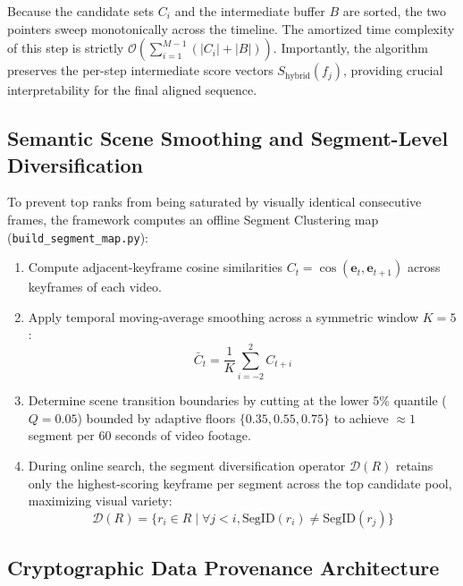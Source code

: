 Because the candidate sets $C_i$ and the intermediate buffer $B$ are sorted, the two pointers sweep monotonically across the timeline. The amortized time complexity of this step is strictly $\mathcal{O}(\sum_{i=1}^{M-1} (|C_i| + |B|))$. Importantly, the algorithm preserves the per-step intermediate score vectors $S_{\text{hybrid}}(f_j)$, providing crucial interpretability for the final aligned sequence.

\subsection{Semantic Scene Smoothing and Segment-Level Diversification}\label{sec:diversify}

To prevent top ranks from being saturated by visually identical consecutive frames, the framework computes an offline Segment Clustering map (\texttt{build\_segment\_map.py}):
\begin{enumerate}[label=\arabic*.]
    \item Compute adjacent-keyframe cosine similarities $C_t = \cos(\mathbf{e}_t, \mathbf{e}_{t+1})$ across keyframes of each video.
    \item Apply temporal moving-average smoothing across a symmetric window $K = 5$:
    \begin{equation}
    \bar{C}_t = \frac{1}{K} \sum_{i=-2}^{2} C_{t+i}
    \end{equation}
    \item Determine scene transition boundaries by cutting at the lower 5\% quantile ($Q = 0.05$) bounded by adaptive floors $\{0.35, 0.55, 0.75\}$ to achieve $\approx 1$ segment per 60 seconds of video footage.
    \item During online search, the segment diversification operator $\mathcal{D}(R)$ retains only the highest-scoring keyframe per segment across the top candidate pool, maximizing visual variety:
    \begin{equation}
    \mathcal{D}(R) = \{r_i \in R \mid \forall j < i, \text{SegID}(r_i) \neq \text{SegID}(r_j)\}
    \end{equation}
\end{enumerate}

\subsection{Cryptographic Data Provenance Architecture}\label{sec:provenance}

